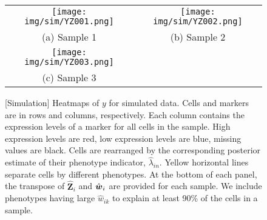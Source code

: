 \documentclass[12pt,]{article}
\def\beginmyfig{\begin{figure}[H]\center}
\def\endmyfig{\end{figure}}
\def\Z{\bm{Z}}
\newcommand{\true}{{\mbox{\tiny TR}}}
\newcommand{\bZ}{\mbox{\boldmath $Z$}}
\newcommand{\bw}{\mbox{\boldmath $w$}}
\def\beginmyfig{\begin{figure}[H]\center}
\def\endmyfig{\end{figure}}
\begin{document}
\begin{figure}%
  \begin{center}
  \begin{tabular}{cc}
  \texttt{[image: img/sim/YZ001.png]}&
  \texttt{[image: img/sim/YZ002.png]}\\
  {\small (a) Sample 1} & {\small(b) Sample 2} \\
  \texttt{[image: img/sim/YZ003.png]}&\\
  {\small (c) Sample 3} & \\
  \end{tabular}
  \end{center}
  \vspace{-0.05in}
  \caption{\small[Simulation]  Heatmaps of $y$ for simulated data. Cells and
    markers are in rows and columns, respectively. Each column contains the
    expression levels of a marker for all cells in the sample. High expression
    levels are red, low expression levels are blue, missing values are black.
    Cells are rearranged by the corresponding posterior estimate of their
    phenotype indicator, $\hat{\lambda}_{in}$.  Yellow horizontal lines separate
    cells by different phenotypes.  At the bottom of each panel, the
    transpose of $\hat{\Z}_i$ and $\hat{\bw}_i$ are provided for each sample.
    We include phenotypes having large $\hat{w}_{ik}$ to explain at least 90\%
    of the cells in a sample.}
\label{fig:sim-post-Z}
\end{figure}






\end{document}

